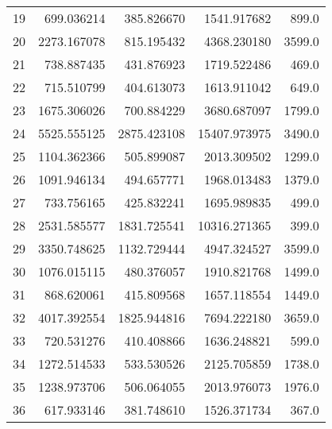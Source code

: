 \documentclass[11pt,a4paper]{article}
\begin{document}
\begin{tabular}{lrrrr}
		19 &       699.036214 &   385.826670 &   1541.917682 &      899.0 \\
		20 &      2273.167078 &   815.195432 &   4368.230180 &     3599.0 \\
		21 &       738.887435 &   431.876923 &   1719.522486 &      469.0 \\
		22 &       715.510799 &   404.613073 &   1613.911042 &      649.0 \\
		23 &      1675.306026 &   700.884229 &   3680.687097 &     1799.0 \\
		24 &      5525.555125 &  2875.423108 &  15407.973975 &     3490.0 \\
		25 &      1104.362366 &   505.899087 &   2013.309502 &     1299.0 \\
		26 &      1091.946134 &   494.657771 &   1968.013483 &     1379.0 \\
		27 &       733.756165 &   425.832241 &   1695.989835 &      499.0 \\
		28 &      2531.585577 &  1831.725541 &  10316.271365 &      399.0 \\
		29 &      3350.748625 &  1132.729444 &   4947.324527 &     3599.0 \\
		30 &      1076.015115 &   480.376057 &   1910.821768 &     1499.0 \\
		31 &       868.620061 &   415.809568 &   1657.118554 &     1449.0 \\
		32 &      4017.392554 &  1825.944816 &   7694.222180 &     3659.0 \\
		33 &       720.531276 &   410.408866 &   1636.248821 &      599.0 \\
		34 &      1272.514533 &   533.530526 &   2125.705859 &     1738.0 \\
		35 &      1238.973706 &   506.064055 &   2013.976073 &     1976.0 \\
		36 &       617.933146 &   381.748610 &   1526.371734 &      367.0 \\
		
		
		\end{tabular}
	
\end{document}

